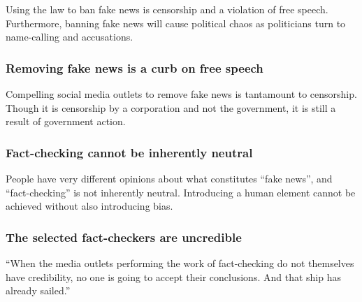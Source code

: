 \par Using the law to ban fake news is censorship and a violation of free speech. Furthermore, banning fake news will cause political chaos as politicians turn to name-calling and accusations. \cite{eff_cali_bill_distrastrous}

\subsubsection{Removing fake news is a curb on free speech}

\par Compelling social media outlets to remove fake news is tantamount to censorship. Though it is censorship by a corporation and not the government, it is still a result of government action. \cite{wp_germany_fake_news_law}

\subsubsection{Fact-checking cannot be inherently neutral}

\par People have very different opinions about what constitutes ``fake news'', and ``fact-checking'' is not inherently neutral. Introducing a human element cannot be achieved without also introducing bias. \cite{vox_sentences_fn}

\subsubsection{The selected fact-checkers are uncredible}

\par ``When the media outlets performing the work of fact-checking do not themselves have credibility, no one is going to accept their conclusions. And that ship has already sailed.'' \cite{vox_sentences_fn}
